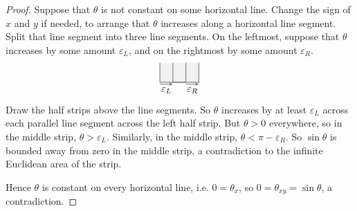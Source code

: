 \begin{proof}
Suppose that \(\theta\) is not constant on some horizontal line.
Change the sign of \(x\) and \(y\) if needed, to arrange that \(\theta\) increases along a horizontal line segment.
Split that line segment into three line segments.
On the leftmost, suppose that \(\theta\) increases by some amount \(\varepsilon_L\), and on the rightmost by some amount \(\varepsilon_R\).
\[
\begin{tikzpicture}[scale=.7]
\fill[gray!40,opacity=.25](-1,0) rectangle (1,1);
\draw[thick,gray] (-1,1) -- (-1,0) -- (1,0) -- (1,1);
\draw[thick,gray] (-.333,1) -- (-.333,0) -- (.333,0) -- (.333,1);
\node (b) at (-.333,-.1){};
\node (c) at (.333,-.1){};
\draw[-stealth,thick,gray] (-1,-.1) -- (-.333,-.1);
\node[below] at (-.666,-.1) {\(\varepsilon_L\)};
\draw[-stealth,thick,gray] (.333,-.1) -- (1,-.1);
\node[below] at (.666,-.1) {\(\varepsilon_R\)};
\end{tikzpicture}
\]
Draw the half strips above the line segments.
So \(\theta\) increases by at least \(\varepsilon_L\) across each parallel line segment across the left half strip.
But \(\theta>0\) everywhere, so in the middle strip, \(\theta>\varepsilon_L\).
Similarly, in the middle strip, \(\theta<\pi-\varepsilon_R\).
So \(\sin \theta\) is bounded away from zero in the middle strip, a contradiction to the infinite Euclidean area of the strip.

Hence \(\theta\) is constant on every horizontal line, i.e. \(0=\theta_x\), so \(0=\theta_{xy}=\sin \theta\), a contradiction.
\end{proof}

